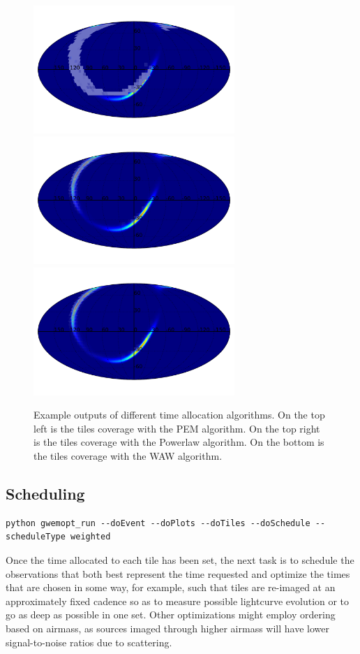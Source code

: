 \documentclass[twocolumn]{aastex61}
\begin{document}
\begin{figure}
    \centering
    \includegraphics[width=3in]{timealloc_pem}
    \includegraphics[width=3in]{timealloc_powerlaw}
    \includegraphics[width=3in]{timealloc_waw}
    \caption{Example outputs of different time allocation algorithms. On the top left is the tiles coverage with the PEM algorithm. On the top right is the tiles coverage with the Powerlaw algorithm. On the bottom is the tiles coverage with the WAW algorithm.}
    \label{fig:timealloc}
\end{figure}


\subsection{Scheduling}
\begin{lstlisting}
python gwemopt_run --doEvent --doPlots --doTiles --doSchedule --scheduleType weighted
\end{lstlisting}
Once the time allocated to each tile has been set, the next task is to schedule the observations that both best represent the time requested and optimize the times that are chosen in some way, for example, such that tiles are re-imaged at an approximately fixed cadence so as to measure possible lightcurve evolution or to go as deep as possible in one set.
Other optimizations might employ ordering based on airmass, as sources imaged through higher airmass will have lower signal-to-noise ratios due to scattering.
\end{document}
